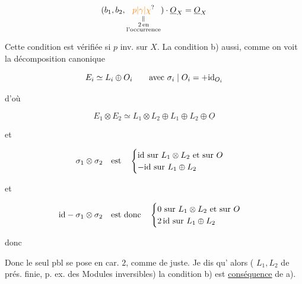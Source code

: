 \[ (b_1,b_2,\underset{\substack{\Vert\\2\,\text{en}\\\text{l'occurrence}}}{\unsure{p|\gamma|\chi}})\cdot\underline{O}_X=\underline{O}_X \]

Cette condition est vérifiée si $p$  inv. sur $X$. La condition b) aussi, comme on voit  la décomposition canonique

\[ E_i\simeq L_i\oplus O_i\qquad\text{avec }\sigma_i\mid O_i=+{\rm id}_{O_i} \]

d'où

\[ E_1\otimes E_2\simeq L_1\otimes L_2\oplus L_1\oplus L_2\oplus\underline O \]

et

\[ \sigma_1\otimes\sigma_2\quad\text{est}\quad\begin{cases}{\rm id}\text{ sur }L_1\otimes L_2\text{ et sur }O\\-{\rm id}\text{ sur }L_1\oplus L_2\end{cases} \]

et

\[ {\rm id}-\sigma_1\otimes\sigma_2\quad\text{est donc}\quad\begin{cases}0\text{ sur }L_1\otimes L_2\text{ et sur }O\\2\,{\rm id}\text{ sur }L_1\oplus L_2\end{cases} \]

donc


Donc le seul pbl se pose en car. $2$, comme de juste. Je dis qu' alors ( $L_1,L_2$ de prés. finie\unsure{\}|)}, p. ex. des Modules inversibles) la condition b) est \uline{conséquence} de a).


